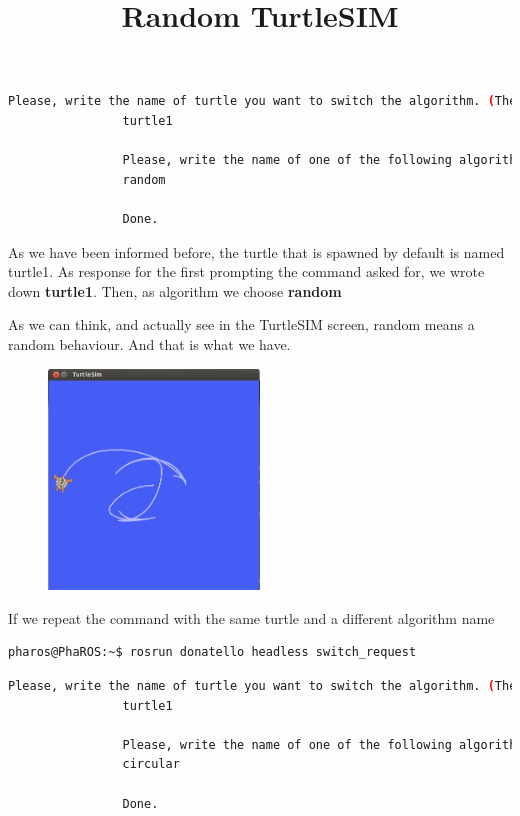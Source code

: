 \documentclass[a4paper,10pt,twoside]{book}
\begin{document}
			\begin{lstlisting}[language=bash,title={Starting up Donatello/SwitchRequest - Interactive Output }]
				Please, write the name of turtle you want to switch the algorithm. (The default one is called turtle1) 
				turtle1

				Please, write the name of one of the following algorithms  #('random' 'quiet' 'pursuiter' 'circular' 'pharo')
				random
				
				Done.
			\end{lstlisting}
			
			
			As we have been informed before, the turtle that is spawned by default is named turtle1. As response for the first prompting the command asked for, we wrote down \textbf{turtle1}. Then, as algorithm we choose \textbf{random}
			
			As we can think, and actually see in the TurtleSIM screen, random means a random behaviour. And that is what we have. 
			
			
			\begin{figure}[!htbp]
  				\centering
    				\includegraphics[width=0.5\textwidth]{RandomTurtleSIM.png}
				\centering
				
				\title{ Random TurtleSIM }
			\end{figure}

			
			
			If we repeat the command with the same turtle and a different algorithm name 

			\begin{lstlisting}[language=bash,title={Starting up Donatello/SwitchRequest}]
				pharos@PhaROS:~$ rosrun donatello headless switch_request
			\end{lstlisting}
			
			\begin{lstlisting}[language=bash,title={Starting up Donatello/SwitchRequest - Interactive Output }]
				Please, write the name of turtle you want to switch the algorithm. (The default one is called turtle1) 
				turtle1

				Please, write the name of one of the following algorithms  #('random' 'quiet' 'pursuiter' 'circular' 'pharo')
				circular
				
				Done.
			\end{lstlisting}
\end{document}
